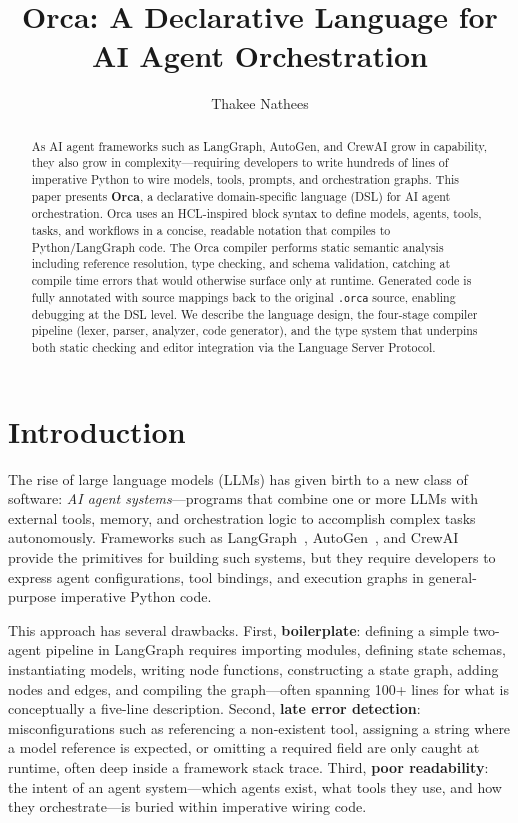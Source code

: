 \documentclass[sigconf,nonacm]{acmart}
\title{Orca: A Declarative Language for AI Agent Orchestration}
\author{Thakee Nathees}
\affiliation{%
  \institution{Curtin University}
  \department{Department of Computing}
  \city{Perth}
  \country{Australia}
}
\begin{document}
\begin{abstract}
As AI agent frameworks such as LangGraph, AutoGen, and CrewAI grow in
capability, they also grow in complexity---requiring developers to write
hundreds of lines of imperative Python to wire models, tools, prompts, and
orchestration graphs. This paper presents \textbf{Orca}, a declarative
domain-specific language (DSL) for AI agent orchestration. Orca uses an
HCL-inspired block syntax to define models, agents, tools, tasks, and
workflows in a concise, readable notation that compiles to
Python/LangGraph code. The Orca compiler performs static semantic analysis
including reference resolution, type checking, and schema validation,
catching at compile time errors that would otherwise surface only at
runtime. Generated code is fully annotated with source mappings back to
the original \texttt{.orca} source, enabling debugging at the DSL level.
We describe the language design, the four-stage compiler pipeline
(lexer, parser, analyzer, code generator), and the type system that
underpins both static checking and editor integration via the Language
Server Protocol.
\end{abstract}

\maketitle

\section{Introduction}
\label{sec:intro}

The rise of large language models (LLMs) has given birth to a new class of
software: \emph{AI agent systems}---programs that combine one or more LLMs
with external tools, memory, and orchestration logic to accomplish complex
tasks autonomously. Frameworks such as LangGraph~\cite{langgraph},
AutoGen~\cite{autogen}, and CrewAI~\cite{crewai} provide the primitives for
building such systems, but they require developers to express agent
configurations, tool bindings, and execution graphs in general-purpose
imperative Python code.

This approach has several drawbacks. First, \textbf{boilerplate}: defining a
simple two-agent pipeline in LangGraph requires importing modules, defining
state schemas, instantiating models, writing node functions, constructing a
state graph, adding nodes and edges, and compiling the graph---often spanning
100+ lines for what is conceptually a five-line description. Second,
\textbf{late error detection}: misconfigurations such as referencing a
non-existent tool, assigning a string where a model reference is expected, or
omitting a required field are only caught at runtime, often deep inside a
framework stack trace. Third, \textbf{poor readability}: the intent of an
agent system---which agents exist, what tools they use, and how they
orchestrate---is buried within imperative wiring code.
\end{document}
